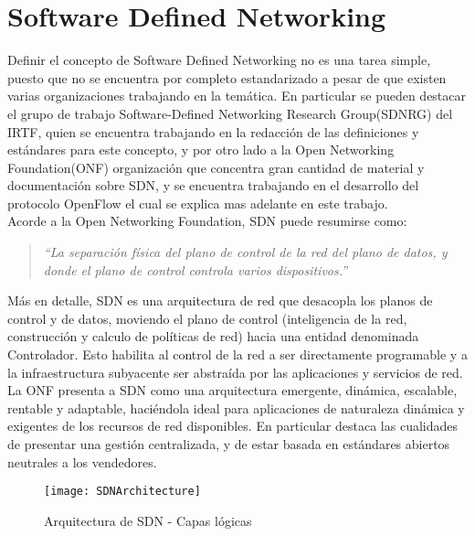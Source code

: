 \section{Software Defined Networking}
\label{section2.2}

Definir el concepto de Software Defined Networking no es una tarea simple, puesto que no se encuentra por completo estandarizado a pesar de que existen varias organizaciones trabajando en la temática. En particular se pueden destacar el grupo de trabajo Software-Defined Networking Research Group(SDNRG) del IRTF, quien se encuentra trabajando en la redacción de las definiciones y estándares para este concepto, y por otro lado a la Open Networking Foundation(ONF) organización que concentra gran cantidad de material y documentación sobre SDN, y se encuentra trabajando en el desarrollo del protocolo OpenFlow el cual se explica mas adelante en este trabajo.\\

Acorde a la Open Networking Foundation, SDN puede resumirse como:

\begin{quote}
\textit{``La separación física del plano de control de la red del plano de datos, y donde el plano de control controla varios dispositivos.''}
\end{quote}

Más en detalle, SDN es una arquitectura de red que desacopla los planos de control y de datos, moviendo el plano de control (inteligencia de la red, construcción y calculo de políticas de red) hacia una entidad denominada Controlador. Esto habilita al control de la red a ser directamente programable y a la infraestructura subyacente ser abstraída por las aplicaciones y servicios de red.\\ 

La ONF presenta a SDN como una arquitectura emergente, dinámica, escalable, rentable y adaptable, haciéndola ideal para aplicaciones de naturaleza dinámica y exigentes de los recursos de red disponibles. En particular destaca las cualidades de presentar una gestión centralizada, y de estar basada en estándares abiertos neutrales a los vendedores.\\

\begin{figure}[htbp!] 
\centering    
\texttt{[image: SDNArchitecture]}
\caption[Arquitectura de SDN - Capas lógicas]{Arquitectura de SDN - Capas lógicas}
\label{fig:SDNArchitecture}
\end{figure}

